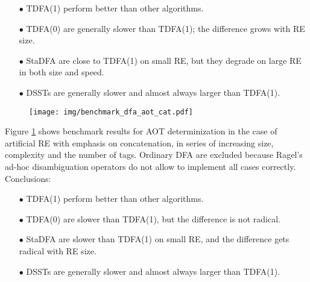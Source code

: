 \documentclass[]{article}
\begin{document}
\begin{itemize}

\item[$\bullet$]
TDFA(1) perform better than other algorithms.
\medskip

\item[$\bullet$]
TDFA(0) are generally slower than TDFA(1); the difference grows with RE size.
\medskip

\item[$\bullet$]
StaDFA are close to TDFA(1) on small RE, but they degrade on large RE in both size and speed.
\medskip

\item[$\bullet$]
DSSTs are generally slower and almost always larger than TDFA(1).

\end{itemize}

\pagebreak

\begin{figure}[t!]
\texttt{[image: img/benchmark\_dfa\_aot\_cat.pdf]}
\label{fig:benchmark_dfa_aot_cat}
\end{figure}

Figure \ref{fig:benchmark_dfa_aot_cat} shows benchmark results for AOT determinization
in the case of artificial RE with emphasis on concatenation, in series of increasing size, complexity and the number of tags.
Ordinary DFA are excluded because Ragel's ad-hoc disambiguation operators do not allow to implement all cases correctly.
Conclusions:
\medskip

\begin{itemize}

\item[$\bullet$]
TDFA(1) perform better than other algorithms.
\medskip

\item[$\bullet$]
TDFA(0) are slower than TDFA(1), but the difference is not radical.
\medskip

\item[$\bullet$]
StaDFA are slower than TDFA(1) on small RE, and the difference gets radical with RE size.
\medskip

\item[$\bullet$]
DSSTs are generally slower and almost always larger than TDFA(1).

\end{itemize}

\pagebreak
\end{document}

